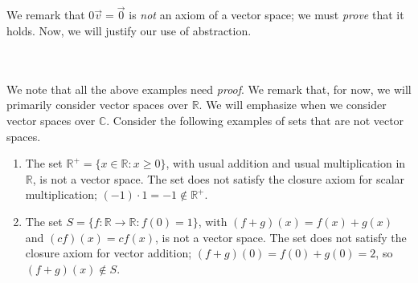        \vphantom
        \\
        \\
        We remark that \(0\vec{v}=\vec{0}\) is \textit{not} an axiom of a vector space; we must \textit{prove} that it holds. Now, we will justify our use of abstraction.
        \vphantom
        \\
        \\
        We note that all the above examples need \textit{proof}. We remark that, for now, we will primarily consider vector spaces over \(\mathbb{R}\). We will emphasize when we consider vector spaces over \(\mathbb{C}\).  Consider the following examples of sets that are not vector spaces.
        \begin{enumerate}
            \item The set \(\mathbb{R}^+=\{x\in\mathbb{R}:x\geq0\}\), with usual addition and usual multiplication in \(\mathbb{R}\), is not a vector space. The set does not satisfy the closure axiom for scalar multiplication; \((-1)\cdot1=-1\nin\mathbb{R}^+\).
            \item The set \(S=\{f:\mathbb{R}\to\mathbb{R}:f(0)=1\}\), with \((f+g)(x)=f(x)+g(x)\) and \((cf)(x)=cf(x)\), is not a vector space. The set does not satisfy the closure axiom for vector addition; \((f+g)(0)=f(0)+g(0)=2\), so \((f+g)(x)\nin S\).
        \end{enumerate}

